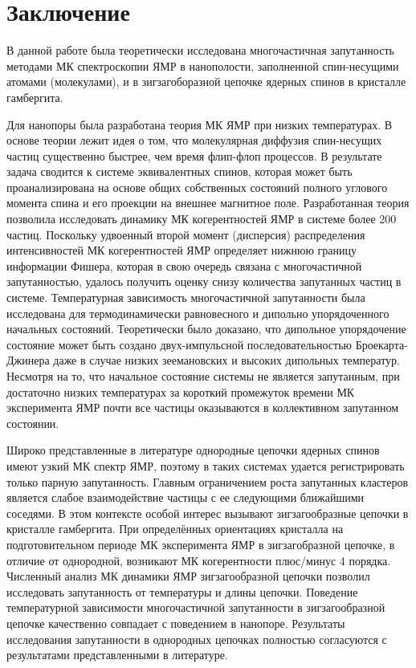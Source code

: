 \chapter*{Заключение}

В данной работе была теоретически исследована многочастичная запутанность методами МК спектроскопии ЯМР в нанополости,
заполненной спин-несущими атомами (молекулами),
и в зигзагоборазной цепочке ядерных спинов в кристалле гамбергита.

Для нанопоры была разработана теория МК ЯМР при низких температурах.
В основе теории лежит идея о том, что молекулярная диффузия спин-несущих частиц существенно быстрее,
чем время флип-флоп процессов.
В результате задача сводится к системе эквивалентных спинов,
которая может быть проанализирована на основе общих собственных состояний полного углового момента спина и его проекции на внешнее магнитное поле.
Разработанная теория позволила исследовать динамику МК когерентностей ЯМР в системе более 200 частиц.
Поскольку удвоенный второй момент (дисперсия) распределения интенсивностей МК когерентностей ЯМР определяет нижнюю границу информации Фишера,
которая в свою очередь связана с многочастичной запутанностью,
удалось получить оценку снизу количества запутанных частиц в системе.
Температурная зависимость многочастичной запутанности была исследована для термодинамически равновесного  и дипольно упорядоченного
начальных состояний.
Теоретически было доказано,
что дипольное упорядочение состояние может быть создано двух-импульсной последовательностью Броекарта-Джинера
даже в случае низких зеемановских и высоких дипольных температур.
Несмотря на то, что начальное состояние системы не является запутанным,
при достаточно низких температурах за короткий промежуток времени МК эксперимента ЯМР почти все частицы оказываются в коллективном запутанном состоянии.

Широко представленные в литературе однородные цепочки ядерных спинов имеют узкий МК спектр ЯМР,
поэтому в таких системах удается регистрировать только парную запутанность.
Главным ограничением роста запутанных кластеров является слабое взаимодействие частицы с ее следующими ближайшими соседями.
В этом контексте особой интерес вызывают зигзагообразные цепочки в кристалле гамбергита.
При определённых ориентациях кристалла на подготовительном периоде МК эксперимента ЯМР в зигзагобразной цепочке,
в отличие от однородной, возникают МК когерентности плюс/минус 4 порядка.
Численный анализ МК динамики ЯМР зигзагообразной цепочки позволил
исследовать запутанность от температуры и длины цепочки.
Поведение температурной зависимости многочастичной запутанности в зигзагообразной цепочке качественно совпадает с поведением в нанопоре.
Результаты исследования запутанности в однородных цепочках полностью согласуются с результатами представленными в литературе.

